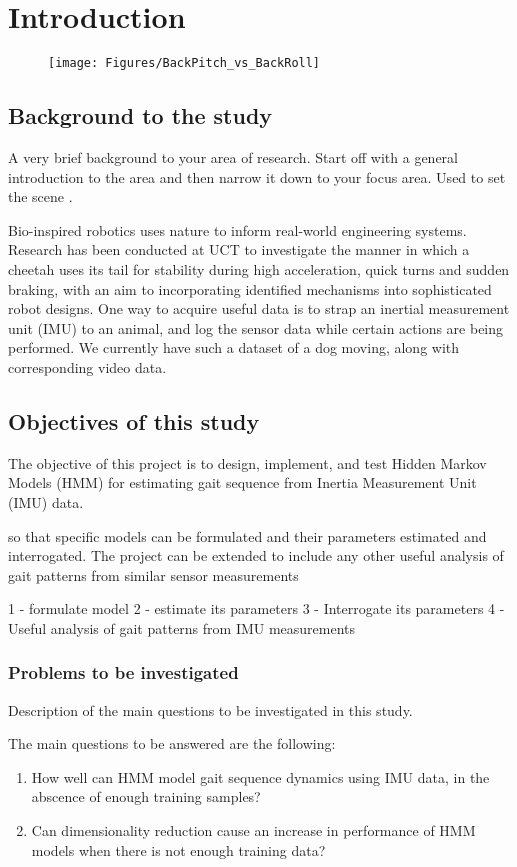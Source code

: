 \chapter{Introduction}

\begin{figure}
	\centering
	\texttt{[image: Figures/BackPitch\_vs\_BackRoll]}
\end{figure}
\section{Background to the study}
A very brief background to your area of research. Start off with a general introduction to the area and
then narrow it down to your focus area. Used to set the scene \cite{smt2011}.

Bio-inspired robotics uses nature to inform real-world engineering
systems. Research has been conducted at UCT to investigate the
manner in which a cheetah uses its tail for stability during high
acceleration, quick turns and sudden braking, with an aim to
incorporating identified mechanisms into sophisticated robot designs.
One way to acquire useful data is to strap an inertial measurement unit
(IMU) to an animal, and log the sensor data while certain actions are
being performed. We currently have such a dataset of a dog moving,
along with corresponding video data.						

\section{Objectives of this study}
The objective of this project is to design, implement, and test Hidden Markov Models (HMM) for estimating gait sequence from Inertia Measurement Unit (IMU) data.

so that specific models can be formulated and their
parameters estimated and interrogated. The project can be extended to
include any other useful analysis of gait patterns from similar sensor
measurements


1 - formulate model
2 - estimate its parameters
3 - Interrogate its parameters
4 - Useful analysis of gait patterns from IMU measurements
\subsection{Problems to be investigated}
Description of the main questions to be investigated in this study.

The main questions to be answered are the following:
\begin{enumerate}
	\item How well can HMM model gait sequence dynamics using IMU data, in the abscence of enough training samples?
	\item Can dimensionality reduction cause an increase in performance of HMM models when there is not enough training data?
\end{enumerate}
